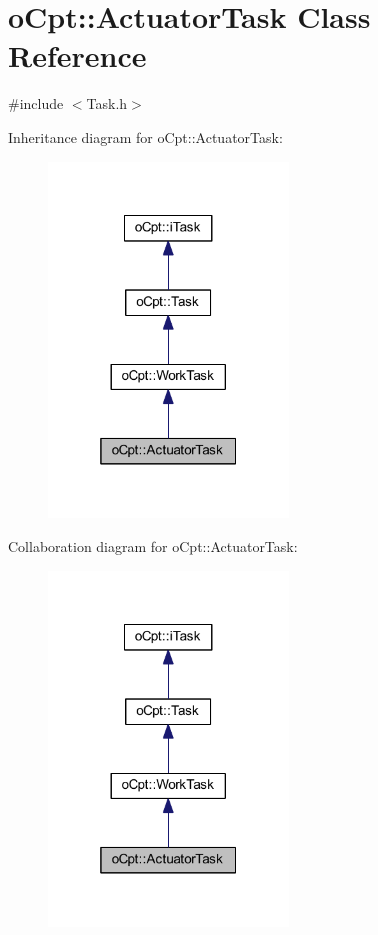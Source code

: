 \hypertarget{classo_cpt_1_1_actuator_task}{}\section{o\+Cpt\+:\+:Actuator\+Task Class Reference}
\label{classo_cpt_1_1_actuator_task}


{\ttfamily \#include $<$Task.\+h$>$}



Inheritance diagram for o\+Cpt\+:\+:Actuator\+Task\+:\nopagebreak
\begin{figure}[H]
\begin{center}
\leavevmode
\includegraphics[width=181pt]{classo_cpt_1_1_actuator_task__inherit__graph}
\end{center}
\end{figure}


Collaboration diagram for o\+Cpt\+:\+:Actuator\+Task\+:\nopagebreak
\begin{figure}[H]
\begin{center}
\leavevmode
\includegraphics[width=181pt]{classo_cpt_1_1_actuator_task__coll__graph}
\end{center}
\end{figure}
